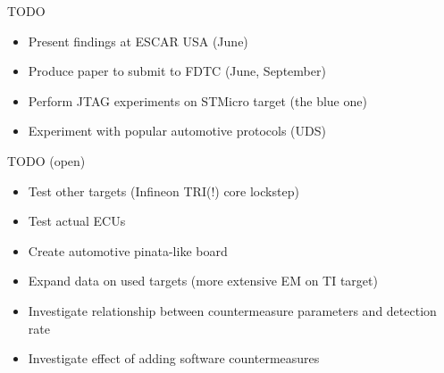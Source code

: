 \documentclass[table]{beamer}
\begin{document}
\begin{frame}
    \tableofcontents[currentsection]
\end{frame}

\begin{frame}{TODO}
    \begin{itemize}
        \item Present findings at ESCAR USA (June)
        \item Produce paper to submit to FDTC (June, September)
        \item Perform JTAG experiments on STMicro target (the blue one)
        \item Experiment with popular automotive protocols (UDS)
    \end{itemize}
\end{frame}

\begin{frame}{TODO (open)}
    \begin{itemize}
      \item Test other targets (Infineon TRI(!) core lockstep)
      \item Test actual ECUs
      \item Create automotive pinata-like board
      \item Expand data on used targets (more extensive EM on TI target)
      \item Investigate relationship between countermeasure parameters and detection rate
      \item Investigate effect of adding software countermeasures
    \end{itemize}
\end{frame}

\end{document}
